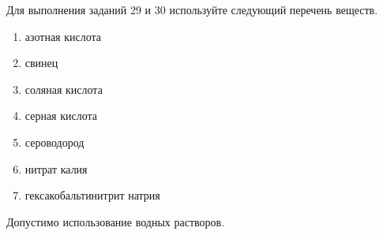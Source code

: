 Для выполнения заданий 29 и 30 используйте следующий перечень веществ. 
\begin{enumerate}
    \item азотная кислота
    \item свинец
    \item соляная кислота
    \item серная кислота
    \item сероводород
    \item нитрат калия
    \item гексакобальтинитрит натрия
\end{enumerate}
Допустимо использование водных растворов.